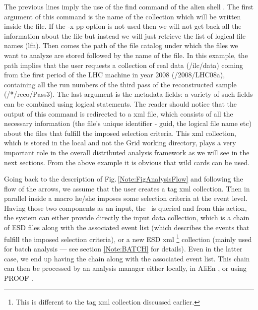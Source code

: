 The previous lines imply the use of the {\ttfamily find} command of the alien shell \cite{Note:RefIlcenTutorial}. The first argument of this command is the name of the collection which will be written inside the file. If the {\ttfamily -x pp} option is not used then we will not get back all the information about the file but instead we will just retrieve the list of logical file names (lfn). Then comes the path of the file catalog under which the files we want to analyze are stored followed by the name of the file. In this example, the path implies that the user requests a collection of real data ({\ttfamily /ilc/data}) coming from the first period of the LHC machine in year 2008 ({\ttfamily /2008/LHC08a}), containing all the run numbers of the third pass of the reconstructed sample ({\ttfamily /*/reco/Pass3}). The last argument is the metadata fields: a variety of such fields can be combined using logical statements. The reader should notice that the output of this command is redirected to a xml file, which consists of all the necessary information (the file's unique identifier - guid, the logical file name etc) about the files that fulfill the imposed selection criteria. This xml collection, which is stored in the local and not the Grid working directory,  plays a very important role in the overall distributed analysis framework as we will see in the next sections. From the above example it is obvious that wild cards can be used.

Going back to the description of Fig.\,\ref{Note:FigAnalysisFlow} and following the flow of the arrows, we assume that the user creates a tag xml collection. Then in parallel inside a macro he/she imposes some selection criteria at the event level. Having those two components as an input, the \tag\ is queried and from this action, the system can either provide directly the input data collection, which is a chain of ESD files along with the associated event list (which describes the events that fulfill the imposed selection criteria), or a new ESD xml \footnote{This is different to the tag xml collection discussed earlier.} collection (mainly used for batch analysis --- see section \ref{Note:BATCH} for details). Even in the latter case, we end up having the chain along with the associated event list. This chain can then be processed by an analysis manager \cite{Note:RefAnalysisFramework} either locally, in AliEn \cite{Note:RefALIEN}, or using PROOF \cite{Note:RefPROOF}.

